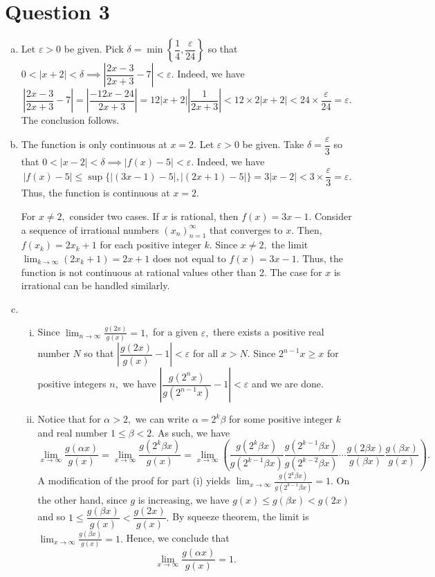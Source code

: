 \documentclass{article}
\begin{document}
\section*{Question 3}
\begin{enumerate}[(a)]
    \item Let $\varepsilon>0$ be given. Pick $\delta=\min\left\{\dfrac{1}{4},\dfrac{\varepsilon}{24}\right\}$ so that $0<|x+2|<\delta\implies \left|\dfrac{2x-3}{2x+3}-7\right|<\varepsilon.$ Indeed, we have $$\left|\frac{2x-3}{2x+3}-7\right|=\left|\frac{-12x-24}{2x+3}\right|=12|x+2|\left|\frac{1}{2x+3}\right|<12\times2|x+2|<24\times\frac{\varepsilon}{24}=\varepsilon.$$ The conclusion follows.
    \item The function is only continuous at $x=2.$ Let $\varepsilon>0$ be given. Take $\delta=\dfrac{\varepsilon}{3}$ so that $0<|x-2|<\delta\implies|f(x)-5|<\varepsilon.$ Indeed, we have $$ |f(x)-5|\leq \sup\{|(3x-1)-5|,|(2x+1)-5|\}=3|x-2|<3\times\frac{\varepsilon}{3}=\varepsilon.$$ Thus, the function is continuous at $x=2.$
    
    For $x\neq2,$ consider two cases. If $x$ is rational, then $f(x)=3x-1.$ Consider a sequence of irrational numbers $(x_n)^{\infty}_{n=1}$ that converges to $x.$ Then, $f(x_k)=2x_k+1$ for each positive integer $k.$ Since $x\neq 2,$ the limit \\ $\displaystyle\lim_{k\to\infty}(2x_k+1)=2x+1$ does not equal to $f(x)=3x-1.$ Thus, the function is not continuous at rational values other than 2. The case for $x$ is irrational can be handled similarly.
    \item \begin{enumerate}[(i)]
        \item Since $\displaystyle\lim_{n\to\infty}\frac{g(2x)}{g(x)}=1,$ for a given $\varepsilon,$ there exists a positive real number $N$ so that $\left|\dfrac{g(2x)}{g(x)}-1\right|<\varepsilon$ for all $x>N.$ Since $2^{n-1}x\geq x$ for positive integers $n,$ we have $\left|\dfrac{g(2^nx)}{g(2^{n-1}x)}-1\right|<\varepsilon$ and we are done.
        \item Notice that for $\alpha>2,$ we can write $\alpha=2^k\beta$ for some positive integer $k$ and real number $1\leq\beta<2.$ As such, we have $$\lim_{x\to\infty}\frac{g(\alpha x)}{g(x)}=\lim_{x\to\infty}\frac{g(2^k\beta x)}{g(x)}=\lim_{x\to\infty}\left(\frac{g(2^k\beta x)}{g(2^{k-1}\beta x)}\frac{g(2^{k-1}\beta x)}{g(2^{k-2}\beta x)}\cdots \frac{g(2\beta x)}{g(\beta x)}\frac{g(\beta x)}{g(x)}\right).$$
        A modification of the proof for part (i) yields $\displaystyle\lim_{x\to\infty}\frac{g(2^k\beta x)}{g(2^{k-1}\beta x)}=1.$ On the other hand, since $g$ is increasing, we have $g(x)\leq g(\beta x)<g(2x)$ and so $1\leq \dfrac{g(\beta x)}{g(x)}<\dfrac{g(2x)}{g(x)}.$ By squeeze theorem, the limit is $\displaystyle\lim_{x\to\infty}\frac{g(\beta x)}{g(x)}=1.$ Hence, we conclude that $$\lim_{x\to\infty}\frac{g(\alpha x)}{g(x)}=1.$$
    \end{enumerate}
\end{enumerate}
\end{document}
